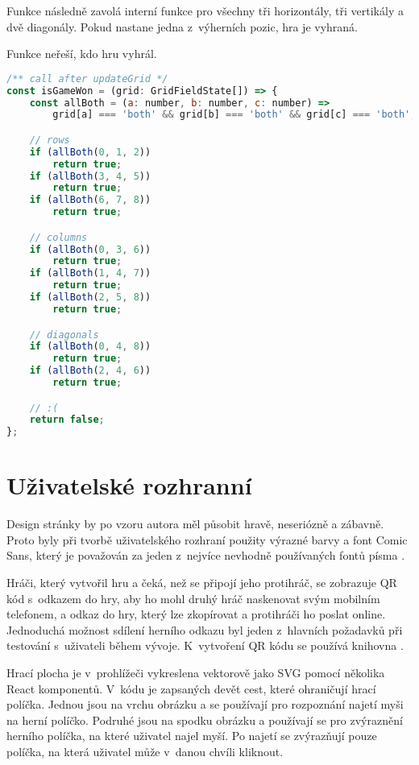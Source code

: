 Funkce  následně zavolá interní funkce  pro všechny tři
horizontály, tři vertikály a dvě diagonály. Pokud nastane jedna z~výherních
pozic, hra je vyhraná.

Funkce neřeší, kdo hru vyhrál.

\begin{lstlisting}[language=JavaScript,caption={Funkce \M{isGameWon}},label={lst:is-game-won}]
/** call after updateGrid */
const isGameWon = (grid: GridFieldState[]) => {
    const allBoth = (a: number, b: number, c: number) =>
        grid[a] === 'both' && grid[b] === 'both' && grid[c] === 'both';

    // rows
    if (allBoth(0, 1, 2))
        return true;
    if (allBoth(3, 4, 5))
        return true;
    if (allBoth(6, 7, 8))
        return true;

    // columns
    if (allBoth(0, 3, 6))
        return true;
    if (allBoth(1, 4, 7))
        return true;
    if (allBoth(2, 5, 8))
        return true;

    // diagonals
    if (allBoth(0, 4, 8))
        return true;
    if (allBoth(2, 4, 6))
        return true;

    // :(
    return false;
};
\end{lstlisting}

\section{Uživatelské rozhranní}\label{sec:user-interface}

Design stránky by po vzoru autora měl působit hravě, neseriózně a zábavně.
Proto byly při tvorbě uživatelského rozhraní použity výrazné barvy a font Comic
Sans, který je považován za jeden z~nejvíce nevhodně používaných fontů písma
\cite{seddon2011}.

Hráči, který vytvořil hru a čeká, než se připojí jeho protihráč, se zobrazuje
QR kód s~odkazem do hry, aby ho mohl druhý hráč naskenovat svým mobilním
telefonem, a odkaz do hry, který lze zkopírovat a protihráči ho poslat online.
Jednoduchá možnost sdílení herního odkazu byl jeden z~hlavních požadavků při
testování s~uživateli během vývoje. K~vytvoření QR kódu se používá knihovna
 \cite{react-qr}.

Hrací plocha je v~prohlížeči vykreslena vektorově jako SVG pomocí několika
React komponentů. V~kódu je zapsaných devět cest, které ohraničují hrací
políčka. Jednou jsou na vrchu obrázku a se používají pro rozpoznání najetí myši
na herní políčko. Podruhé jsou na spodku obrázku a používají se pro zvýraznění
herního políčka, na které uživatel najel myší. Po najetí se zvýrazňují pouze
políčka, na která uživatel může v~danou chvíli kliknout.
